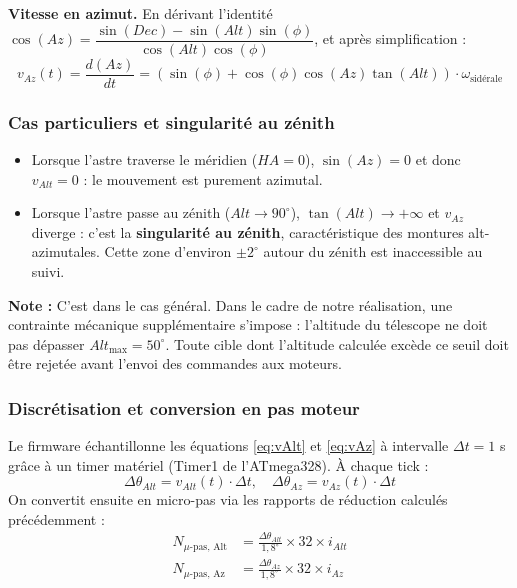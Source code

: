 \documentclass[12pt,a4paper]{report}
\begin{document}
\begin{enumerate}
\textbf{Vitesse en azimut.} En dérivant l'identité $\cos(Az) = \dfrac{\sin(Dec) - \sin(Alt)\sin(\phi)}{\cos(Alt)\cos(\phi)}$, et après simplification :
\begin{equation}
    \boxed{\;v_{Az}(t) = \frac{d(Az)}{dt} = \left(\sin(\phi) + \cos(\phi)\cos(Az)\tan(Alt)\right) \cdot \omega_{\text{sidérale}}\;}
    \label{eq:vAz}
\end{equation}

\subsubsection{Cas particuliers et singularité au zénith}
\begin{itemize}
    \item Lorsque l'astre traverse le méridien ($HA = 0$), $\sin(Az) = 0$ et donc $v_{Alt} = 0$ : le mouvement est purement azimutal.
    \item Lorsque l'astre passe au zénith ($Alt \to 90^\circ$), $\tan(Alt) \to +\infty$ et $v_{Az}$ diverge : c'est la \textbf{singularité au zénith}, caractéristique des montures alt-azimutales. Cette zone d'environ $\pm 2^\circ$ autour du zénith est inaccessible au suivi.
\end{itemize}
\textbf{Note :} C'est dans le cas général. 
Dans le cadre de notre réalisation, une contrainte mécanique supplémentaire 
s'impose : l'altitude du télescope ne doit pas dépasser $Alt_{\max} = 50^\circ$. 
Toute cible dont l'altitude calculée excède ce seuil doit être rejetée avant 
l'envoi des commandes aux moteurs.

\subsubsection{Discrétisation et conversion en pas moteur}
Le firmware échantillonne les équations \eqref{eq:vAlt} et \eqref{eq:vAz} à intervalle $\Delta t = 1$ s grâce à un timer matériel (Timer1 de l'ATmega328). À chaque tick :
\begin{equation}
    \Delta\theta_{Alt} = v_{Alt}(t) \cdot \Delta t, \quad \Delta\theta_{Az} = v_{Az}(t) \cdot \Delta t
\end{equation}
On convertit ensuite en micro-pas via les rapports de réduction calculés précédemment :
\begin{align}
    N_{\mu\text{-pas, Alt}} &= \frac{\Delta\theta_{Alt}}{1{,}8^\circ} \times 32 \times i_{Alt} \\
    N_{\mu\text{-pas, Az}}  &= \frac{\Delta\theta_{Az}}{1{,}8^\circ}  \times 32 \times i_{Az}
\end{align}


\end{enumerate}
\end{document}
